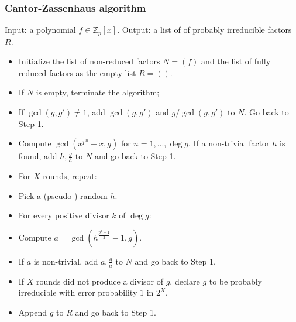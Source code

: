 \begin{frame}
\footnotesize
\frametitle{Cantor-Zassenhaus algorithm}
Input: a polynomial $f\in \mathbb Z_p[x]$. Output: a list of of probably irreducible factors $R$.
\begin{itemize}
\item<2->[0] Initialize the list of non-reduced factors  $N=(f)$ and the list of fully reduced factors as the empty list $R=()$. 
\item<3->[1] If $N$ is empty, terminate the algorithm;
\item<5->[2]  If $\gcd(g,g')\neq 1$, add $\gcd(g,g')$ and $g/\gcd(g,g')$ to $N$. Go back to Step 1.
\item<6->[3] Compute $\gcd (x^{p^n}-x, g)$ for $n=1,..., \deg g$. If a non-trivial factor $h$ is found, add $h,\frac{g}{h}$ to $N$ and go back to Step 1.
\item<7->[4] For $X$ rounds, repeat:
\item<8->[4.1] Pick a (pseudo-) random $h$.
\item<9->[4.2] For every positive divisor $k$ of $\deg g$:
\item<10->[4.2.1] Compute $a=\gcd \left(h^{\frac{p^k-1}{2}}-1,g \right)$.
\item<11->[4.2.2] If $a$ is non-trivial, add $a,\frac{g}{a}$ to $N$ and go back to Step 1.
\item<12->[5] If $X$ rounds did not produce a divisor of $g$, declare $g$ to be probably irreducible with error probability $1$ in $2^X$. 
\item<13->[6] Append $g$ to $R$ and go back to Step 1.
\end{itemize}
\end{frame}